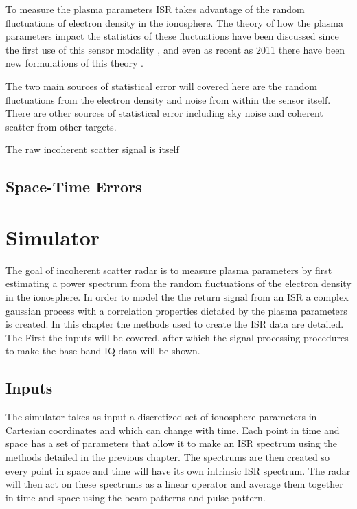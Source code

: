 \documentclass[draft,ras]{agutex}
\begin{document}
\begin{article}
To measure the plasma parameters ISR takes advantage of the random fluctuations of electron density in the ionosphere. The theory of how the plasma parameters impact the statistics of these fluctuations have been discussed since the first use of this sensor modality \citep{gordon58,dougherty:farley1960, farleydougherty:ISR2, doughteryfarley:ISR3, hagfors1961}, and even as recent as 2011 there have been new formulations of this theory \citep{kudeki:milla:1,kudeki:milla:2}. 

The two main sources of statistical error will covered here are the random fluctuations from the electron density and noise from within the sensor itself. There are other sources of statistical error including sky noise and coherent scatter from other targets. 

The raw incoherent scatter signal is itself
\subsection{Space-Time Errors}

\section{Simulator}

The goal of incoherent scatter radar is to measure plasma parameters by first estimating a power spectrum from the random fluctuations of the electron density in the ionosphere. In order to model the the return signal from an ISR a complex gaussian process with a correlation properties dictated by the plasma parameters is created. 
In this chapter the methods used to create the ISR data are detailed. The First the inputs will be covered, after which the signal processing procedures to make the base band IQ data will be shown.

\subsection{Inputs}
The simulator takes as input a discretized set of ionosphere parameters in Cartesian coordinates and which can change with time. Each point in time and space has a set of parameters that allow it to make an ISR spectrum using the methods detailed in the previous chapter. The spectrums are then created so every point in space and time will have its own intrinsic ISR spectrum. The radar will then act on these spectrums as a linear operator and average them together in time and space using the beam patterns and pulse pattern. 


\end{article}
\end{document}
